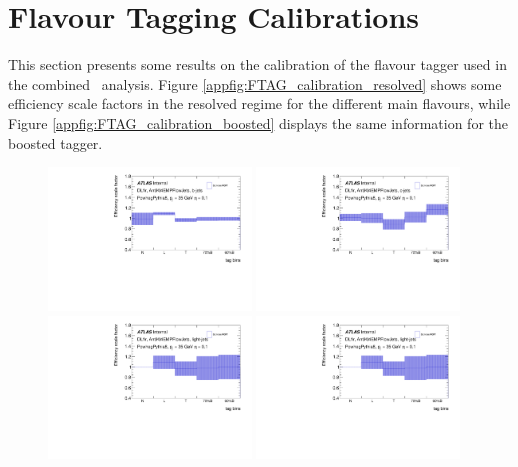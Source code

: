 
\section{Flavour Tagging Calibrations}\label{appsec-vh-ftagcal}
This section presents some results on the calibration of the flavour tagger used in the combined \vhbc\ analysis. Figure \ref{appfig:FTAG_calibration_resolved} shows some efficiency scale factors in the resolved regime for the different main flavours, while Figure \ref{appfig:FTAG_calibration_boosted} displays the same information for the boosted tagger.

\begin{figure}
    \centering
    \includegraphics[width=0.48\textwidth]{Images/VH/Obj/FTAGCalib/ftagres/DL1r_AntiKt4EMPFlowJets_BTagging201903_Continuous2D_B_410470_30_eta01.pdf}
    \includegraphics[width=0.48\textwidth]{Images/VH/Obj/FTAGCalib/ftagres/DL1r_AntiKt4EMPFlowJets_BTagging201903_Continuous2D_C_410470_30_eta01.pdf}\\
    \includegraphics[width=0.48\textwidth]{Images/VH/Obj/FTAGCalib/ftagres/DL1r_AntiKt4EMPFlowJets_BTagging201903_Continuous2D_Light_410470_30_eta01.pdf}
    \includegraphics[width=0.48\textwidth]{Images/VH/Obj/FTAGCalib/ftagres/DL1r_AntiKt4EMPFlowJets_BTagging201903_Continuous2D_Light_410470_30_eta01.pdf}

\end{figure}
